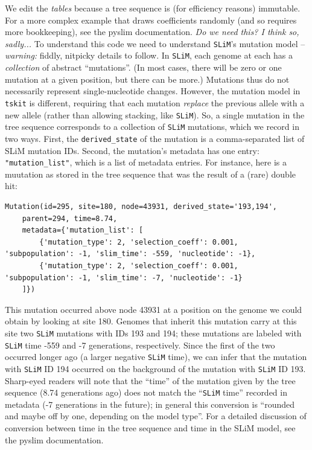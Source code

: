 \documentclass[12pt]{article}
\newcommand{\tskit}[0]{\texttt{tskit}\xspace}
\newcommand{\slim}[0]{\texttt{SLiM}\xspace}
\newcommand{\comment}[1]{\textit{\color{green} #1}}
\begin{document}
We edit the \emph{tables} because a tree sequence is (for efficiency reasons) immutable.
For a more complex example that draws coefficients randomly (and so requires more bookkeeping),
see the pyslim documentation.
\comment{Do we need this? I think so, sadly...}
To understand this code we need to understand \slim's mutation model --
\emph{warning:} fiddly, nitpicky details to follow.
In \slim, each genome at each has a \emph{collection} of abstract ``mutations''.
(In most cases, there will be zero or one mutation at a given position,
but there can be more.)
Mutations thus do not necessarily represent single-nucleotide changes.
However, the mutation model in \tskit is different, requiring that each mutation
\emph{replace} the previous allele with a new allele (rather than allowing stacking, like \slim).
So, a single mutation in the tree sequence corresponds to a collection of \slim mutations,
which we record in two ways.
First, the \verb|derived_state| of the mutation is a comma-separated list of SLiM mutation IDs.
Second, the mutation's metadata has one entry: \verb|"mutation_list"|,
which is a list of metadata entries.
For instance, here is a muutation as stored in the tree sequence
that was the result of a (rare) double hit:
\begin{listing}
    \begin{verbatim}
Mutation(id=295, site=180, node=43931, derived_state='193,194',
    parent=294, time=8.74,
    metadata={'mutation_list': [
        {'mutation_type': 2, 'selection_coeff': 0.001, 'subpopulation': -1, 'slim_time': -559, 'nucleotide': -1},
        {'mutation_type': 2, 'selection_coeff': 0.001, 'subpopulation': -1, 'slim_time': -7, 'nucleotide': -1}
    ]})
    \end{verbatim}
\end{listing}
This mutation occurred
above node 43931 at a position on the genome we could obtain by looking at site 180.
Genomes that inherit this mutation carry at this site two \slim mutations with IDs 193 and 194;
these mutations are labeled with \slim time -559 and -7 generations, respectively.
Since the first of the two occurred longer ago (a larger negative \slim time),
we can infer that the mutation with \slim ID 194 occurred on the background
of the mutation with \slim ID 193.
Sharp-eyed readers will note that the ``time'' of the mutation given by the tree sequence
(8.74 generations ago) does not match the ``\slim time'' recorded in metadata
(-7 generations in the future);
in general this conversion is ``rounded and maybe off by one, depending on the model type''.
For a detailed discussion of conversion between time in the tree sequence
and time in the SLiM model, see the pyslim documentation.
\end{document}
